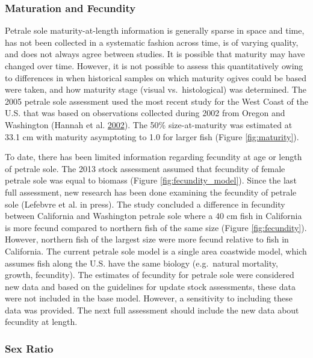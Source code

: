\documentclass[12pt,]{article}
\begin{document}
\subsubsection{Maturation and Fecundity}\label{maturation-and-fecundity}

Petrale sole maturity-at-length information is generally sparse in space
and time, has not been collected in a systematic fashion across time, is
of varying quality, and does not always agree between studies. It is
possible that maturity may have changed over time. However, it is not
possible to assess this quantitatively owing to differences in when
historical samples on which maturity ogives could be based were taken,
and how maturity stage (visual vs.~histological) was determined. The
2005 petrale sole assessment used the most recent study for the West
Coast of the U.S. that was based on observations collected during 2002
from Oregon and Washington (Hannah et al.
\protect\hyperlink{ref-hannah_length_2002}{2002}). The 50\%
size-at-maturity was estimated at 33.1 cm with maturity asymptoting to
1.0 for larger fish (Figure \ref{fig:maturity}).

To date, there has been limited information regarding fecundity at age
or length of petrale sole. The 2013 stock assessment assumed that
fecundity of female petrale sole was equal to biomass (Figure
\ref{fig:fecundity_model}). Since the last full assessment, new research
has been done examining the fecundity of petrale sole (Lefebvre et al.
in press). The study concluded a difference in fecundity between
California and Washington petrale sole where a 40 cm fish in California
is more fecund compared to northern fish of the same size (Figure
\ref{fig:fecundity}). However, northern fish of the largest size were
more fecund relative to fish in California. The current petrale sole
model is a single area coastwide model, which assumes fish along the
U.S. have the same biology (e.g.~natural mortality, growth, fecundity).
The estimates of fecundity for petrale sole were considered new data and
based on the guidelines for update stock assessments, these data were
not included in the base model. However, a sensitivity to including
these data was provided. The next full assessment should include the new
data about fecundity at length.

\subsubsection{Sex Ratio}\label{sex-ratio}
\end{document}
